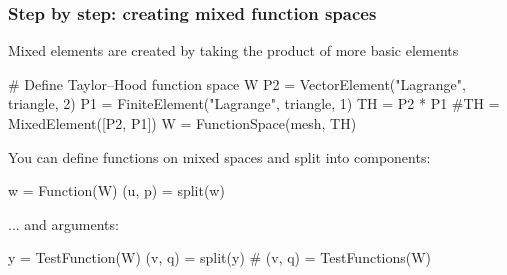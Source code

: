 \begin{frame}[fragile]
  \frametitle{Step by step: creating mixed function spaces}

  Mixed elements are created by taking the product of more basic elements
  \vspace{-1em}
  \begin{python}
# Define Taylor--Hood function space W
P2 = VectorElement("Lagrange", triangle, 2)
P1 = FiniteElement("Lagrange", triangle, 1)
TH = P2 * P1
#TH = MixedElement([P2, P1])
W = FunctionSpace(mesh, TH)
  \end{python}

  You can define functions on mixed spaces and split into components:
  \vspace{-1em}
  \begin{python}
w = Function(W)
(u, p) = split(w)
  \end{python}
  ... and arguments:
  \vspace{-1em}
  \begin{python}
y = TestFunction(W)
(v, q) = split(y)
# (v, q) = TestFunctions(W)
  \end{python}

\end{frame}
